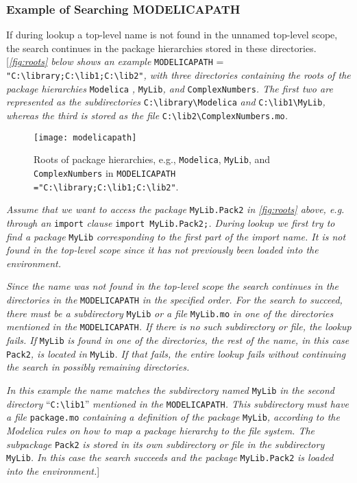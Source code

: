 \subsubsection{Example of Searching MODELICAPATH}

If during lookup a top-level name is not found in the unnamed top-level
scope, the search continues in the package hierarchies stored in these
directories. {[}\emph{\autoref{fig:roots} below shows an example} \lstinline!MODELICAPATH! =
\lstinline!"C:\library;C:\lib1;C:\lib2"!\emph{,
with three directories containing the roots of the package hierarchies}
\lstinline!Modelica! \emph{,} \lstinline!MyLib!\emph{, and} \lstinline!ComplexNumbers!\emph{. The first two are represented as the subdirectories} \lstinline!C:\library\Modelica! \emph{and}
\lstinline!C:\lib1\MyLib!\emph{, whereas the third is stored
as the file} \lstinline!C:\lib2\ComplexNumbers.mo!\emph{.}

\begin{figure}[H]
\caption{Roots of package hierarchies, e.g.,
\texttt{Modelica}, \texttt{MyLib}, and \texttt{ComplexNumbers} in
\texttt{MODELICAPATH ="C:\textbackslash library;C:\textbackslash lib1;C:\textbackslash lib2"}.}
\label{fig:roots}
\texttt{[image: modelicapath]}
\end{figure}

\emph{Assume that we want to access the package} \lstinline!MyLib.Pack2! \emph{in
\autoref{fig:roots} above, e.g. through an} \lstinline!import! \emph{clause}
\lstinline!import MyLib.Pack2;!\emph{. During lookup we first try to find a package} \lstinline!MyLib!
\emph{corresponding to the first part of the import name. It is not
found in the top-level scope since it has not previously been loaded
into the environment. }

\emph{Since the name was not found in the top-level scope the search
continues in the directories in the} \lstinline!MODELICAPATH! \emph{in the specified
order. For the search to succeed, there must be a subdirectory} \lstinline!MyLib!
\emph{or a file} \lstinline!MyLib.mo! \emph{in one of the directories mentioned in
the} \lstinline!MODELICAPATH!\emph{. If there is no such subdirectory or file, the
lookup fails. If} \lstinline!MyLib! \emph{is found in one of the directories, the
rest of the name, in this case} \lstinline!Pack2!\emph{, is located in} \lstinline!MyLib!\emph{.
If that fails, the entire lookup fails without continuing the search in
possibly remaining directories.}

\emph{In this example the name matches the subdirectory named} \lstinline!MyLib!
\emph{in the second directory} ``\lstinline!C:\lib1!''
\emph{mentioned in the} \lstinline!MODELICAPATH!\emph{. This subdirectory must have
a file} \lstinline!package.mo! \emph{containing a definition of the package}
\lstinline!MyLib!\emph{, according to the Modelica rules on how to map a package
hierarchy to the file system. The subpackage} \lstinline!Pack2! \emph{is stored in
its own subdirectory or file in the subdirectory} \lstinline!MyLib!\emph{. In this
case the search succeeds and the package} \lstinline!MyLib.Pack2! \emph{is loaded
into the environment.}{]}
